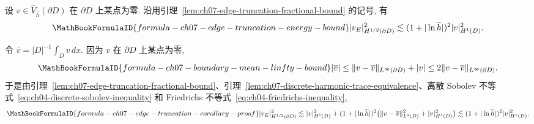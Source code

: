 \begin{Corollary}
\label{cor:ch07-edge-truncation-energy-bound}
设 $v\in\widehat V_{\widehat h}(\partial D)$ 在 $\partial D$ 上某点为零. 沿用引理~\ref{lem:ch07-edge-truncation-fractional-bound} 的记号, 有
\[
\MathBookFormulaID{formula-ch07-edge-truncation-energy-bound}
|v_E|_{H^{1/2}(\partial D)}^2
\lesssim(1+|\ln\widehat h|)^2|v|_{H^1(D)}^2.
\]
\end{Corollary}

\begin{Proof}
令 $\overline v=|D|^{-1}\int_Dv\,dx$. 因为 $v$ 在 $\partial D$ 上某点为零,
\[
\MathBookFormulaID{formula-ch07-boundary-mean-linfty-bound}
|\overline v|\leq\|v-\overline v\|_{L^\infty(\partial D)}
+|v|\leq2\|v-\overline v\|_{L^\infty(\partial D)}.
\]
于是由引理~\ref{lem:ch07-edge-truncation-fractional-bound}、引理~\ref{lem:ch07-discrete-harmonic-trace-equivalence}、离散 Sobolev 不等式~\eqref{eq:ch04-discrete-sobolev-inequality} 和 Friedrichs 不等式~\eqref{eq:ch04-friedrichs-inequality},
\[
\MathBookFormulaID{formula-ch07-edge-truncation-corollary-proof}
|v_E|_{H^{1/2}(\partial D)}^2
\lesssim|v|_{H^1(D)}^2
+(1+|\ln\widehat h|)^2
\bigl(\|v-\overline v\|_{L^2(D)}^2+|v|_{H^1(D)}^2\bigr)
\lesssim(1+|\ln\widehat h|)^2|v|_{H^1(D)}^2.
\]
\end{Proof}
